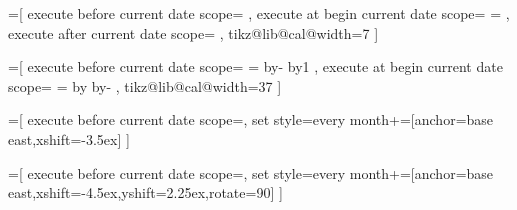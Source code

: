 %
%

=[%
  execute before current date scope={%
  }, 
  execute at begin current date scope={%
    \setlength\pgf@x{\tikz@lib@cal@xshift}%
    \pgf@x=\pgfcalendarcurrentweekday\pgf@x%
    \pgftransformxshift{\pgf@x}%
  },
  execute after current date scope={%
  },
  tikz@lib@cal@width=7
]



%
%

=[%
  execute before current date scope={%
    {%
      \edef\tikz@lib@cal@month@list@start{\pgfcalendarcurrentweekday}%
    }{}%
    {%
      {%
        \c@pgf@counta=\pgfcalendarcurrentjulian%
        \advance\c@pgf@counta by-\pgfcalendarcurrentday%
        \advance\c@pgf@counta by1\relax%
        \pgfcalendarjuliantoweekday{\c@pgf@counta}{\c@pgf@countb}%
        \xdef\pgf@temp{\the\c@pgf@countb}%
      }%
      \let\tikz@lib@cal@month@list@start=\pgf@temp%
    }{}%
  }, 
  execute at begin current date scope={%
    \setlength\pgf@xa{\tikz@lib@cal@xshift}%
    \pgf@xb=\pgfcalendarcurrentday\pgf@xa%
    \advance\pgf@xb by\tikz@lib@cal@month@list@start\pgf@xa%
    \advance\pgf@xb by-\pgf@xa\relax%
    \pgftransformxshift{\pgf@xb}%
  },
  tikz@lib@cal@width=37
]




%
%

=[%
  execute before current date scope={},
  set style={{every month}+=[anchor=base east,xshift=-3.5ex]}
]

=[%
  execute before current date scope={},
  set style={{every month}+=[anchor=base east,xshift=-4.5ex,yshift=2.25ex,rotate=90]}
]
  
